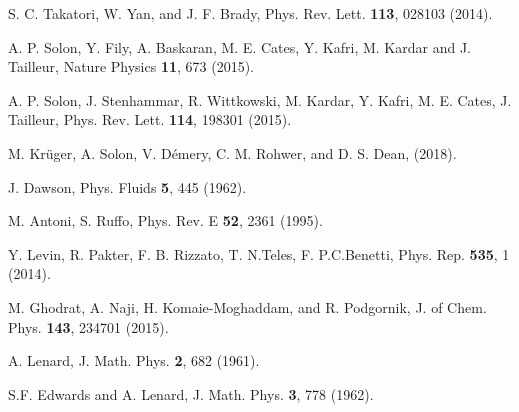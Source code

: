 \documentclass[pre,twocolumn,graphicx]{revtex4-1}
\begin{document}
\begin{thebibliography}{99}
S. C. Takatori, W. Yan, and J. F. Brady, Phys. Rev. Lett. {\bf 113}, 028103 (2014).

A. P. Solon, Y. Fily, A. Baskaran, M. E. Cates, Y. Kafri, M. Kardar and J. Tailleur, Nature Physics {\bf 11}, 673 (2015).

A. P. Solon, J. Stenhammar, R. Wittkowski, M. Kardar, Y. Kafri, M. E. Cates, J. Tailleur, Phys. Rev. Lett. {\bf 114}, 198301 (2015).

M. Kr\"uger, A. Solon, V. D\'emery, C. M. Rohwer, and D. S. Dean, (2018).














J. Dawson, Phys. Fluids {\bf 5}, 445 (1962).

M. Antoni, S. Ruffo, Phys. Rev. E {\bf 52}, 2361 (1995).  

Y. Levin, R. Pakter, F. B. Rizzato, T. N.Teles, F. P.C.Benetti, Phys. Rep. {\bf 535}, 1 (2014).







M. Ghodrat, A. Naji, H. Komaie-Moghaddam, and R. Podgornik, J. of Chem. Phys. {\bf 143}, 234701 (2015).  








A. Lenard, J. Math. Phys. {\bf 2}, 682 (1961).

S.F. Edwards and A. Lenard, J. Math. Phys. {\bf 3}, 778  (1962). 






























\end{thebibliography}

\end{document}
